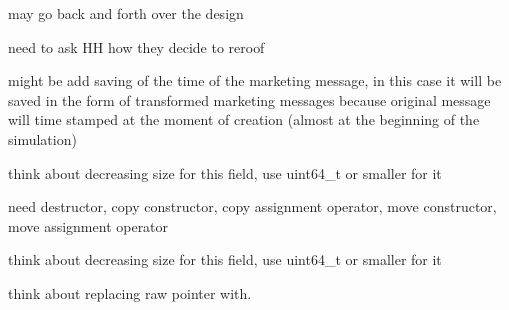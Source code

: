 \begin{DoxyRefList}
\item[\label{_dev_stage2__DevStage2000005}%
\hypertarget{_dev_stage2__DevStage2000005}{}%
Member \hyperlink{classsolar__core_1_1_household_aaa1f1e52009d8aef32d3c5a9367b93b7}{solar\+\_\+core\+:\+:Household\+:\+:dec\+\_\+evaluate\+\_\+designs} ()]may go back and forth over the design 
\item[\label{_dev_stage2__DevStage2000009}%
\hypertarget{_dev_stage2__DevStage2000009}{}%
Member \hyperlink{classsolar__core_1_1_household_aa63241ca3fcc1f2374d10b5c7f44124a}{solar\+\_\+core\+:\+:Household\+:\+:dec\+\_\+project\+\_\+reroof} (std\+::shared\+\_\+ptr$<$ P\+V\+Project $>$ project)]need to ask H\+H how they decide to reroof  
\item[\label{_dev_stage2__DevStage2000003}%
\hypertarget{_dev_stage2__DevStage2000003}{}%
Member \hyperlink{classsolar__core_1_1_household_ac9d26af7b52f0cdc357fc5dca4b86ad9}{solar\+\_\+core\+:\+:Household\+:\+:get\+\_\+inf} (std\+::shared\+\_\+ptr$<$ Mes\+Marketing\+S\+E\+I $>$ mes\+\_\+) override]might be add saving of the time of the marketing message, in this case it will be saved in the form of transformed marketing messages because original message will time stamped at the moment of creation (almost at the beginning of the simulation)  
\item[\label{_dev_stage2__DevStage2000011}%
\hypertarget{_dev_stage2__DevStage2000011}{}%
Member \hyperlink{classsolar__core_1_1_household_a1104d8264fe733937e1fd2e9ad0f8fc1}{solar\+\_\+core\+:\+:Household\+:\+:house} ]think about decreasing size for this field, use uint64\+\_\+t or smaller for it  
\item[\label{_dev_stage2__DevStage2000008}%
\hypertarget{_dev_stage2__DevStage2000008}{}%
Member \hyperlink{classsolar__core_1_1_household_a5f84bf614d0ec70abf9597ec97e07b1a}{solar\+\_\+core\+:\+:Household\+:\+:Household} (Property\+Tree \&pt\+\_\+, \hyperlink{classsolar__core_1_1_w}{W} $\ast$w\+\_\+)]need destructor, copy constructor, copy assignment operator, move constructor, move assignment operator 
\item[\label{_dev_stage2__DevStage2000010}%
\hypertarget{_dev_stage2__DevStage2000010}{}%
Member \hyperlink{classsolar__core_1_1_household_a1ba6b7af82982096e05d99a70a2647eb}{solar\+\_\+core\+:\+:Household\+:\+:location\+\_\+y} ]think about decreasing size for this field, use uint64\+\_\+t or smaller for it  
\item[\label{_dev_stage2__DevStage2000012}%
\hypertarget{_dev_stage2__DevStage2000012}{}%
Member \hyperlink{classsolar__core_1_1_household_a297842358a2d79db160566106972bc0d}{solar\+\_\+core\+:\+:Household\+:\+:preliminary\+\_\+quotes} ]think about replacing raw pointer with. 


\end{DoxyRefList}
